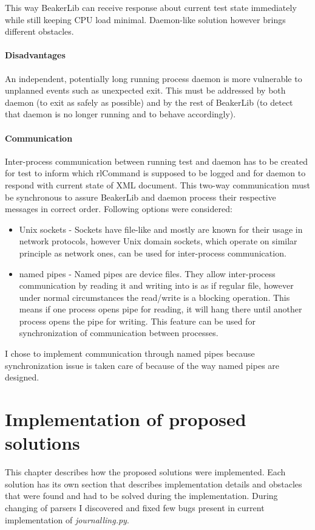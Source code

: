 This way BeakerLib can receive response about current test state immediately while still keeping CPU load minimal. Daemon-like solution however brings different obstacles.

\subsubsection{Disadvantages}
An independent, potentially long running process daemon is more vulnerable to unplanned events such as unexpected exit. This must be addressed by both daemon (to exit as safely as possible)  and by the rest of BeakerLib (to detect that daemon is no longer running and to behave accordingly). 

\subsubsection{Communication}
Inter-process communication between running test and daemon has to be created for test to inform which rlCommand is supposed to be logged and for daemon to respond with current state of XML document. This two-way communication must be synchronous to assure BeakerLib and daemon process their respective messages in correct order. Following options were considered:

\begin{itemize}
\item Unix sockets - Sockets have file-like and mostly are known for their usage in network protocols, however Unix domain sockets, which operate on similar principle as network ones, can be used for inter-process communication.
\item named pipes - Named pipes are device files. They allow inter-process communication by reading it and writing into is as if regular file, however under normal circumstances the read/write is a blocking operation\cite{pipes_blocking}. This means if one process opens pipe for reading, it will hang there until another process opens the pipe for writing. This feature can be used for synchronization of communication between processes. 
\end{itemize}

I chose to implement communication through named pipes because synchronization issue is taken care of because of the way named pipes are designed.

\chapter{Implementation of proposed solutions}
\label{implementations}
This chapter describes how the proposed solutions were implemented. Each solution has its own section that describes implementation details and obstacles that were found and had to be solved during the implementation.
During changing of parsers I discovered and fixed few bugs present in current implementation of \textit{journalling.py}.

